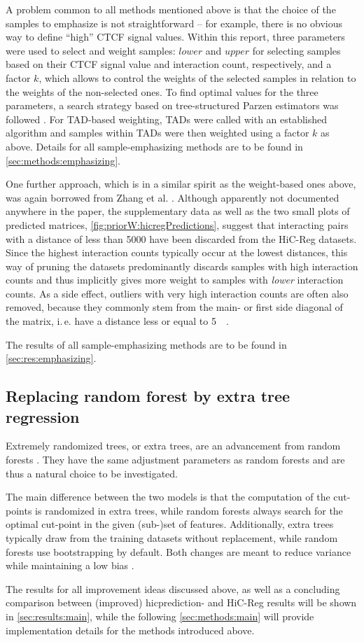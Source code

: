 A problem common to all methods mentioned above is that the choice of the samples to emphasize is 
not straightforward -- for example, there is no obvious way to define ``high'' CTCF signal values.
Within this report, three parameters were used to select and weight samples: $lower$ and $upper$ for
selecting samples based on their CTCF signal value and interaction count, respectively, and a factor $k$, which 
allows to control the weights of the selected samples in relation to the weights of the non-selected ones.
To find optimal values for the three parameters, a search strategy based on tree-structured Parzen estimators
was followed \cite{Bergstra2011}.
For TAD-based weighting, TADs were called with an established algorithm and samples within TADs were then 
weighted using a factor $k$ as above. 
Details for all sample-emphasizing methods are to be found in \autoref{sec:methods:emphasizing}.

One further approach, which is in a similar spirit as the weight-based ones above,
was again borrowed from Zhang et al. \cite{Zhang2019}. 
Although apparently not documented anywhere in the paper,
the supplementary data as well as the two small plots of predicted matrices, 
\autoref{fig:priorW:hicregPredictions},
suggest that interacting pairs with a distance of less than \SI{5000}{\bp} have been discarded
from the HiC-Reg datasets. 
Since the highest interaction counts typically occur at the lowest distances,
this way of pruning the datasets predominantly discards samples with high interaction counts
and thus implicitly gives more weight to samples with \emph{lower} interaction counts.
As a side effect, outliers with very high interaction counts are often also removed,
because they commonly stem from the main- or first side diagonal of the matrix, i.\,e. have a distance less or equal to \SI{5}{\kilo\bp}.

The results of all sample-emphasizing methods are to be found in \autoref{sec:res:emphasizing}.

\subsection{Replacing random forest by extra tree regression}
Extremely randomized trees, or extra trees, are an advancement from random forests \cite{Geurts2006}.
They have the same adjustment parameters as random forests and are thus a natural choice to be investigated.

The main difference between the two models is that the computation of the cut-points is randomized in extra trees,
while random forests always search for the optimal cut-point in the given (sub-)set of features.
Additionally, extra trees typically draw from the training datasets without replacement,
while random forests use bootstrapping by default.
Both changes are meant to reduce variance while maintaining a low bias \cite{Geurts2006}.

The results for all improvement ideas discussed above, as well as a concluding comparison between
(improved) hicprediction- and HiC-Reg results will be shown in \autoref{sec:results:main},
while the following \autoref{sec:methods:main} will provide implementation details for the methods introduced above.

